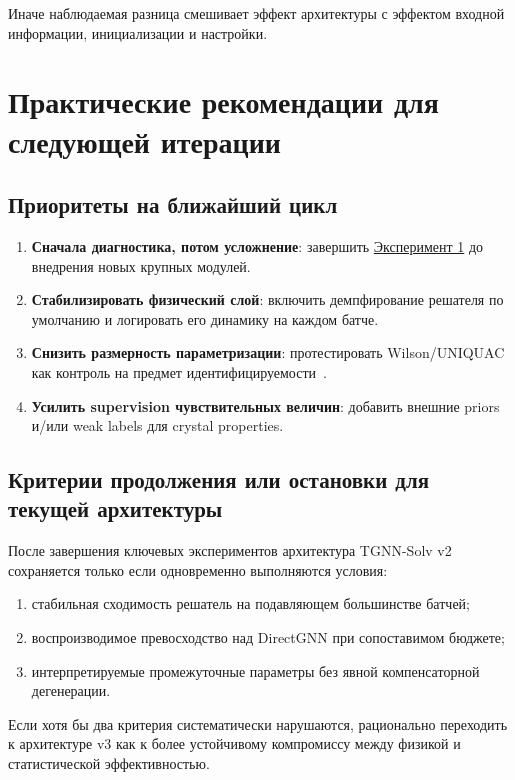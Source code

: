 \documentclass[11pt]{article}
\begin{document}
Иначе наблюдаемая разница смешивает эффект архитектуры с эффектом входной информации, инициализации и настройки.

\section{Практические рекомендации для следующей итерации}

\subsection{Приоритеты на ближайший цикл}

\begin{enumerate}
  \item \textbf{Сначала диагностика, потом усложнение}: завершить \hyperref[subsec:exp-full-budget]{Эксперимент 1} до внедрения новых крупных модулей.
  \item \textbf{Стабилизировать физический слой}: включить демпфирование решателя по умолчанию и логировать его динамику на каждом батче.
  \item \textbf{Снизить размерность параметризации}: протестировать Wilson/UNIQUAC как контроль на предмет идентифицируемости~\cite{wilson1964,abrams1975}.
  \item \textbf{Усилить supervision чувствительных величин}: добавить внешние priors и/или weak labels для crystal properties.
\end{enumerate}

\subsection{Критерии продолжения или остановки для текущей архитектуры}

После завершения ключевых экспериментов архитектура TGNN-Solv v2 сохраняется только если одновременно выполняются условия:
\begin{enumerate}
  \item стабильная сходимость решатель на подавляющем большинстве батчей;
  \item воспроизводимое превосходство над DirectGNN при сопоставимом бюджете;
  \item интерпретируемые промежуточные параметры без явной компенсаторной дегенерации.
\end{enumerate}

Если хотя бы два критерия систематически нарушаются, рационально переходить к архитектуре v3 как к более устойчивому компромиссу между физикой и статистической эффективностью.
\end{document}
